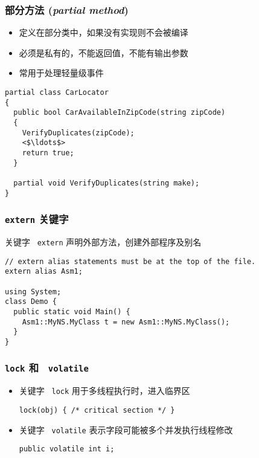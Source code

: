 \begin{frame}[fragile]
\frametitle{部分方法 (\textit{partial method})}
\begin{itemize}
\item 定义在部分类中，如果没有实现则不会被编译
\item 必须是私有的，不能返回值，不能有输出参数
\item 常用于处理轻量级事件
\end{itemize}
\begin{lstlisting}[escapeinside=<>]
partial class CarLocator
{
  public bool CarAvailableInZipCode(string zipCode)
  {
    VerifyDuplicates(zipCode);
    <$\ldots$>
    return true;
  }

  partial void VerifyDuplicates(string make);
}
\end{lstlisting}
\end{frame}


\begin{frame}[fragile]
\frametitle{\texttt{extern} 关键字}
关键字 ~\texttt{extern} 声明外部方法，创建外部程序及别名

\begin{lstlisting}
// extern alias statements must be at the top of the file.
extern alias Asm1;

using System;
class Demo {
  public static void Main() {
    Asm1::MyNS.MyClass t = new Asm1::MyNS.MyClass();
  }
}
\end{lstlisting}

\end{frame}

\begin{frame}[fragile]
\frametitle{\texttt{lock} 和~ \texttt{volatile}}
\begin{itemize}
\item 关键字 ~\texttt{lock} 用于多线程执行时，进入临界区
\begin{lstlisting}
lock(obj) { /* critical section */ }
\end{lstlisting}
\item 关键字 ~\texttt{volatile} 表示字段可能被多个并发执行线程修改
\begin{lstlisting}
public volatile int i;
\end{lstlisting}
\end{itemize}
\end{frame}


